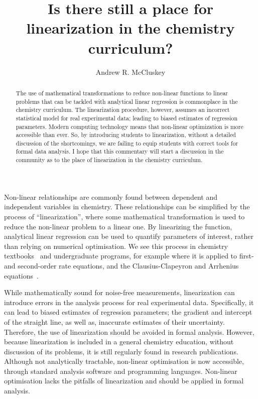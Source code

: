 \documentclass[journal=jceda8,manuscript=article]{achemso}
\author{Andrew R. McCluskey}
\affiliation{European Spallation Source ERIC, Ole Maaløes vej 3, 2200 København N, DK}
\title{Is there still a place for linearization in the chemistry curriculum?}
\begin{document}
\begin{abstract}
    The use of mathematical transformations to reduce non-linear functions to linear problems that can be tackled with analytical linear regression is commonplace in the chemistry curriculum. 
    The linearization procedure, however, assumes an incorrect statistical model for real experimental data; leading to biased estimates of regression parameters. 
    Modern computing technology means that non-linear optimization is more accessible than ever. 
    So, by introducing students to linearization, without a detailed discussion of the shortcomings, we are failing to equip students with correct tools for formal data analysis. 
    I hope that this commentary will start a discussion in the community as to the place of linearization in the chemistry curriculum. 
\end{abstract}

\maketitle 

Non-linear relationships are commonly found between dependent and independent variables in chemistry.
These relationships can be simplified by the process of ``linearization'', where some mathematical transformation is used to reduce the non-linear problem to a linear one. 
By linearizing the function, analytical linear regression can be used to quantify parameters of interest, rather than relying on numerical optimisation. 
We see this process in chemistry textbooks~\cite{monk_math_2010,atkins_physical_2018} and undergraduate programs, for example where it is applied to first- and second-order rate equations, and the Clausius-Clapeyron and Arrhenius equations~\cite{perrin_linear_2017,harper_data_2017,monk_math_2010}.

While mathematically sound for noise-free measurements, linearization can introduce errors in the analysis process for real experimental data. 
Specifically, it can lead to biased estimates of regression parameters; the gradient and intercept of the straight line, as well as, inaccurate estimates of their uncertainty. 
Therefore, the use of linearization should be avoided in formal analysis. 
However, because linearization is included in a general chemistry education, without discussion of its problems, it is still regularly found in research publications. 
Although not analytically tractable, non-linear optimisation is now accessible, through standard analysis software and programming languages.
Non-linear optimisation lacks the pitfalls of linearization and should be applied in formal analysis.
\end{document}
